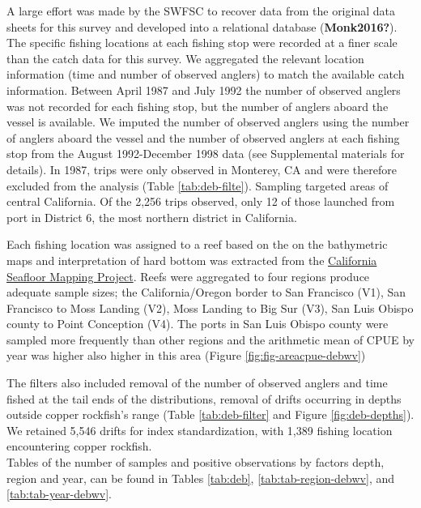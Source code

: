 \documentclass[11pt,
  english,
  letterpaper,
]{article}
\begin{document}
A large effort was made by the SWFSC to recover data from the original data sheets for this survey and developed into a relational database (\textbf{Monk2016?}). The specific fishing locations at each fishing stop were recorded at a finer scale than the catch data for this survey. We aggregated the relevant location information (time and number of observed anglers) to match the available catch information. Between April 1987 and July 1992 the number of observed anglers was not recorded for each fishing stop, but the number of anglers aboard the vessel is available. We imputed the number of observed anglers using the number of anglers aboard the vessel and the number of observed anglers at each fishing stop from the August 1992-December 1998 data (see Supplemental materials for details). In 1987, trips were only observed in Monterey, CA and were therefore excluded from the analysis (Table \ref{tab:deb-filte}). Sampling targeted areas of central California. Of the 2,256 trips observed, only 12 of those launched from port in District 6, the most northern district in California.

Each fishing location was assigned to a reef based on the on the bathymetric maps and interpretation of hard bottom was extracted from the \href{http://seafloor.otterlabs.org/index.html}{California Seafloor Mapping Project}. Reefs were aggregated to four regions produce adequate sample sizes; the California/Oregon border to San Francisco (V1), San Francisco to Moss Landing (V2), Moss Landing to Big Sur (V3), San Luis Obispo county to Point Conception (V4). The ports in San Luis Obispo county were sampled more frequently than other regions and the arithmetic mean of CPUE by year was higher also higher in this area (Figure \ref{fig:fig-areacpue-debwv})

The filters also included removal of the number of observed anglers and time fished at the tail ends of the distributions, removal of drifts occurring in depths outside copper rockfish's range (Table \ref{tab:deb-filter} and Figure \ref{fig:deb-depths}). We retained 5,546 drifts for index standardization, with 1,389 fishing location encountering copper rockfish.\\
Tables of the number of samples and positive observations by factors depth, region and year, can be found in Tables \ref{tab:deb}, \ref{tab:tab-region-debwv}, and \ref{tab:tab-year-debwv}.
\end{document}
